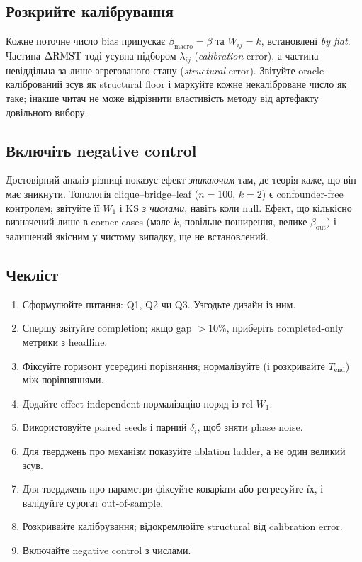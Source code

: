 \documentclass[11pt,a4paper]{article}
\begin{document}
\subsection{Розкрийте калібрування}
\label{sec:calib}

Кожне поточне число bias припускає $\beta_{\mathrm{macro}}=\beta$ та
$W_{ij}=k$, встановлені \emph{by fiat}.  Частина $\Delta\mathrm{RMST}$ тоді усувна
підбором $\lambda_{ij}$ (\emph{calibration} error), а частина невіддільна за
лише агрегованого стану (\emph{structural} error).  Звітуйте
oracle-калібрований зсув як structural floor і маркуйте кожне некаліброване
число як таке; інакше читач не може відрізнити властивість методу від
артефакту довільного вибору.

\subsection{Включіть negative control}
\label{sec:negctrl}

Достовірний аналіз різниці показує ефект \emph{зникаючим} там, де теорія
каже, що він має зникнути.  Топологія clique--bridge--leaf ($n=100$, $k=2$) є
confounder-free контролем; звітуйте її $W_1$ і KS \emph{з числами}, навіть коли
null.  Ефект, що кількісно визначений лише в corner cases (мале $k$, повільне
поширення, велике $\beta_{\mathrm{out}}$) і залишений якісним у чистому випадку,
ще не встановлений.

\subsection{Чекліст}

\begin{enumerate}
  \item Сформулюйте питання: Q1, Q2 чи Q3.  Узгодьте дизайн із ним.
  \item Спершу звітуйте completion; якщо gap $>10\%$, приберіть completed-only метрики
        з headline.
  \item Фіксуйте горизонт усередині порівняння; нормалізуйте (і розкривайте $T_{\mathrm{end}}$)
        між порівняннями.
  \item Додайте effect-independent нормалізацію поряд із rel-$W_1$.
  \item Використовуйте paired seeds і парний $\delta_i$, щоб зняти phase noise.
  \item Для тверджень про механізм показуйте ablation ladder, а не один великий зсув.
  \item Для тверджень про параметри фіксуйте коваріати або регресуйте їх, і
        валідуйте сурогат out-of-sample.
  \item Розкривайте калібрування; відокремлюйте structural від calibration error.
  \item Включайте negative control з числами.
\end{enumerate}
\end{document}
